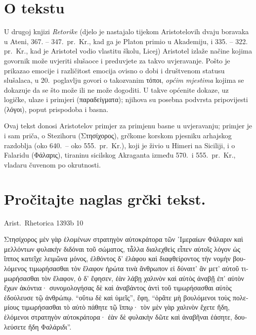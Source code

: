 


\section*{O tekstu}

U drugoj knjizi \textit{Retorike} (djelo je nastajalo tijekom Aristotelovih dvaju boravaka u Ateni, 367. – 347.\ pr.~Kr., kad ga je Platon primio u Akademiju, i 335. – 322. pr.~Kr., kad je Aristotel vodio vlastitu školu, Licej) Aristotel izlaže načine kojima govornik može uvjeriti slušaoce i preduvjete za takvo uvjeravanje. Pošto je prikazao emocije i različitost emocija ovisno o dobi i društvenom statusu slušalaca, u 20.\ poglavlju govori o takozvanim τόποι, \textit{općim mjestima} kojima se dokazuje da se što može ili ne može dogoditi. U takve općenite dokaze, uz logičke, ulaze i primjeri \textgreek[variant=ancient]{(παραδείγματα);} njihova su posebna podvrsta pripovijesti \textgreek[variant=ancient]{(λόγοι),} poput prispodoba i basna. 

Ovaj tekst donosi Aristotelov primjer za primjenu basne u uvjeravanju; primjer je i sam priča, o Stezihoru \textgreek[variant=ancient]{(Στησίχορος),} grčkome korskom pjesniku arhajskog razdoblja (oko 640.\ – oko 555.\ pr.~Kr.), koji je živio u Himeri na Siciliji, i o Falaridu \textgreek[variant=ancient]{(Φάλαρις),} tiraninu sicilskog Akraganta između 570.\ i 555.\ pr.~Kr., vladaru čuvenom po okrutnosti.

\newpage

\section*{Pročitajte naglas grčki tekst.}

Arist.\ Rhetorica 1393b 10

\medskip

{\large
\begin{greek}
\noindent Στησίχορος μὲν γὰρ ἑλομένων στρατηγὸν αὐτοκράτορα τῶν ῾Ιμεραίων Φάλαριν καὶ μελλόντων φυλακὴν διδόναι τοῦ σώματος, τἆλλα διαλεχθεὶς εἶπεν αὐτοῖς λόγον ὡς ἵππος κατεῖχε λειμῶνα μόνος, ἐλθόντος δ' ἐλάφου καὶ διαφθείροντος τὴν νομὴν βουλόμενος τιμωρήσασθαι τὸν ἔλαφον ἠρώτα τινὰ ἄνθρωπον εἰ δύναιτ' ἂν μετ' αὐτοῦ τιμωρήσασθαι τὸν ἔλαφον, ὁ δ' ἔφησεν, ἐὰν λάβῃ χαλινὸν καὶ αὐτὸς ἀναβῇ ἐπ' αὐτὸν ἔχων ἀκόντια· συνομολογήσας δὲ καὶ ἀναβάντος ἀντὶ τοῦ τιμωρήσασθαι αὐτὸς ἐδούλευσε τῷ ἀνθρώπῳ. ``οὕτω δὲ καὶ ὑμεῖς'', ἔφη, ``ὁρᾶτε μὴ βουλόμενοι τοὺς πολεμίους τιμωρήσασθαι τὸ αὐτὸ πάθητε τῷ ἵππῳ· τὸν μὲν γὰρ χαλινὸν ἔχετε ἤδη, ἑλόμενοι στρατηγὸν αὐτοκράτορα· ἐὰν δὲ φυλακὴν δῶτε καὶ ἀναβῆναι ἐάσητε, δουλεύσετε ἤδη Φαλάριδι''.

\end{greek}
}

